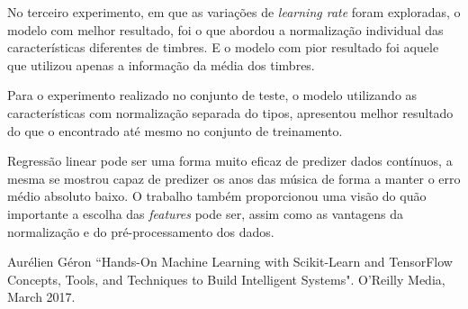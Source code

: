 \documentclass[conference]{IEEEtran}
\begin{document}
No terceiro experimento, em que as variações de \textit{learning rate} foram exploradas, o modelo com melhor resultado, foi o que abordou a normalização individual das características diferentes de timbres. E o modelo com pior resultado foi aquele que utilizou apenas a informação da média dos timbres.

Para o experimento realizado no conjunto de teste, o modelo utilizando as características com normalização separada do tipos, apresentou melhor resultado do que o encontrado até mesmo no conjunto de treinamento. 

Regressão linear pode ser uma forma muito eficaz de predizer dados contínuos, a mesma se mostrou capaz de predizer os anos das música de forma a manter o erro médio absoluto baixo. O trabalho também proporcionou uma visão do quão importante a escolha das \emph{features} pode ser, assim como as vantagens da normalização e do pré-processamento dos dados.


\begin{thebibliography}{00}
 Aurélien Géron ``Hands-On Machine Learning with Scikit-Learn and TensorFlow
Concepts, Tools, and Techniques to Build Intelligent Systems". O'Reilly Media, March 2017.
\end{thebibliography}
\end{document}
